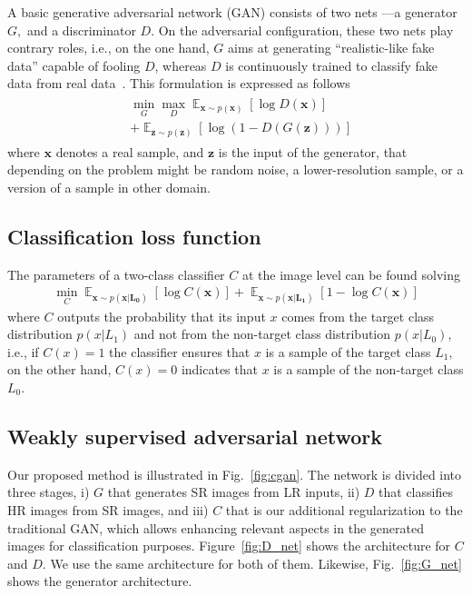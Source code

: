 \documentclass[10pt,twocolumn,letterpaper]{article}
\DeclareMathOperator*{\E}{\mathbb{E}}
\providecommand{\ve}[1]{{\bm{#1}}} %
\begin{document}
A basic generative adversarial network (GAN) consists of two nets ---a generator $G,$ and a discriminator $D$. On the adversarial configuration, these two nets play contrary roles, i.e., on the one hand, $G$ aims at generating ``realistic-like fake data'' capable of fooling $D$, whereas $D$ is continuously trained to classify fake data from real data~\cite{Goodfellow2014}. This formulation is expressed as follows
\begin{eqnarray}
\label{eq:gan}
\begin{aligned}
& \min_G \max_D \E_{\ve{x} \sim p(\ve{x})}[\log D(\ve{x})]\\
& +\E_{\ve{z} \sim p(\ve{z})}[\log (1 - D(G(\ve{z})))]  
\end{aligned}
\end{eqnarray}
where $\ve{x}$ denotes a real sample, and $\ve{z}$ is the input of the generator, that depending on the problem might be random noise, a lower-resolution sample, or a version of a sample in other domain.

\subsection{Classification loss function}

The parameters of a two-class classifier $C$ at the image level can be found solving
\begin{eqnarray}
\label{eq:cnet}
\min_C \E_{\ve{x} \sim p(\ve{x|L_0})}[\log C(\ve{x})] +  \E_{\ve{x} \sim p(\ve{x|L_1})}[1-\log C(\ve{x})]
\end{eqnarray}
where $C$ outputs the probability that its input $x$ comes from the target class distribution $p(x|L_1)$ and not from the non-target class distribution $p(x|L_0),$ i.e., if $C(x)=1$ the classifier ensures that $x$ is a sample of the target class $L_1,$ on the other hand, $C(x)=0$ indicates that $x$ is a sample of the non-target class $L_0$.

\subsection{Weakly supervised adversarial network}

Our proposed method is illustrated in Fig.~\ref{fig:cgan}. The network is divided into three stages, i) $G$ that generates SR images from LR inputs, ii) $D$ that classifies HR images from SR images, and iii) $C$ that is our additional regularization to the traditional GAN, which allows enhancing relevant aspects in the generated images for classification purposes. Figure~\ref{fig:D_net} shows the architecture for $C$ and $D.$ We use the same architecture for both of them. Likewise, Fig.~\ref{fig:G_net} shows the generator architecture.
\end{document}
